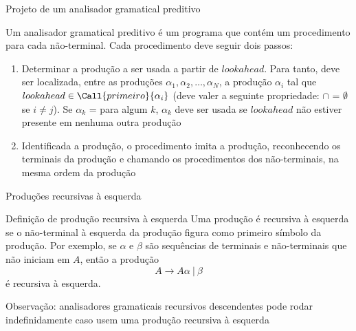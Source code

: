 \begin{frame}[fragile]{Projeto de um analisador gramatical preditivo}

    Um analisador gramatical preditivo é um programa que contém um procedimento para cada não-terminal. Cada procedimento deve seguir dois passos:

    \begin{enumerate}
        \item Determinar a produção a ser usada a partir de $lookahead$. Para tanto, deve ser localizada, entre as produções $\alpha_1, \alpha_2, \ldots, \alpha_N$,
            a produção $\alpha_i$ tal que $lookahead \in \Call{primeiro}{\alpha_i}$ (deve valer a seguinte propriedade:  $\cap$
             = $\emptyset$ se $i\neq j$). Se $\alpha_k$ =  para algum $k$, $\alpha_k$ deve ser usada se $lookahead$ não estiver
            presente em nenhuma outra produção

        \item Identificada a produção, o procedimento imita a produção, reconhecendo os terminais da produção e chamando os procedimentos dos não-terminais, na
            mesma ordem da produção
    \end{enumerate}

\end{frame}

\begin{frame}[fragile]{Produções recursivas à esquerda}

    \begin{block}{Definição de produção recursiva à esquerda}
        Uma produção é recursiva à esquerda se o não-terminal à esquerda da produção figura como primeiro símbolo da produção. Por exemplo, se $\alpha$ e $\beta$
        são sequências de terminais e não-terminais que não iniciam em $A$, então a produção
        \[
            A \to A\alpha\ |\ \beta
        \]
        é recursiva à esquerda.
    \end{block}

    \vspace{0.2in}
    Observação: analisadores gramaticais recursivos descendentes pode rodar indefinidamente caso usem uma produção recursiva à esquerda
\end{frame}

